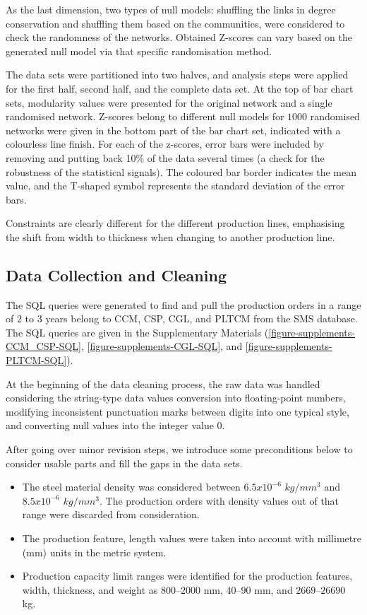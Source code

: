 As the last dimension, two types of null models: shuffling the links in degree conservation and shuffling them based on the communities, were considered to check the randomness of the networks. Obtained Z-scores can vary based on the generated null model via that specific randomisation method.

The data sets were partitioned into two halves, and analysis steps were applied for the first half, second half, and the complete data set. At the top of bar chart sets, modularity values were presented for the original network and a single randomised network. Z-scores belong to different null models for $1000$ randomised networks were given in the bottom part of the bar chart set, indicated with a colourless line finish. For each of the z-scores, error bars were included by removing and putting back 10\% of the data several times (a check for the robustness of the statistical signals). The coloured bar border indicates the mean value, and the T-shaped symbol represents the standard deviation of the error bars.

Constraints are clearly different for the different production lines, emphasising the shift from width to thickness when changing to another production line. 

\subsection*{Data Collection and Cleaning}
%

The SQL queries were generated to find and pull the production orders in a range of $2$ to $3$ years belong to CCM, CSP, CGL, and PLTCM from the SMS database. The SQL queries are given in the Supplementary Materials (\ref{figure-supplements-CCM_CSP-SQL}, \ref{figure-supplements-CGL-SQL}, and \ref{figure-supplements-PLTCM-SQL}). 

At the beginning of the data cleaning process, the raw data was handled considering the string-type data values conversion into floating-point numbers, modifying inconsistent punctuation marks between digits into one typical style, and converting null values into the integer value $0$. 

After going over minor revision steps, we introduce some preconditions below to consider usable parts and fill the gaps in the data sets.
\begin{itemize}
	\item The steel material density was considered between $6.5 x 10^{-6}$ $kg/mm^{3}$ and $8.5 x 10^{-6}$ $kg/mm^{3}$. The production orders with density values out of that range were discarded from consideration.
	\item The production feature, length values were taken into account with millimetre (mm) units in the metric system.
	\item Production capacity limit ranges were identified for the production features, width, thickness, and weight as $800$--$2000$ mm, $40$--$90$ mm, and $2669$--$26690$ kg.
\end{itemize}

